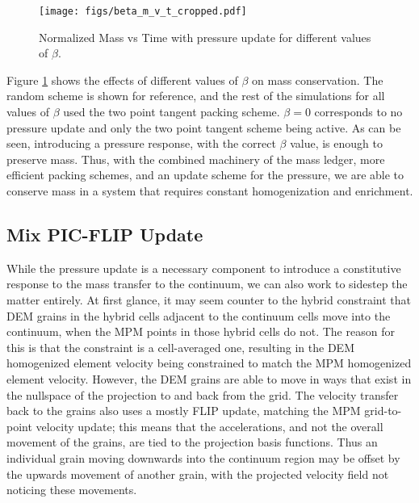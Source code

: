 \begin{figure}[htp] 
    \centering
    \texttt{[image: figs/beta\_m\_v\_t\_cropped.pdf]}
    \caption{Normalized Mass vs Time with pressure update for different values of $\beta$.}
    \label{beta_m_v_t}
\end{figure}

Figure \ref{beta_m_v_t} shows the effects of different values of $\beta$ on mass conservation. The random scheme is shown for reference, and the rest of the simulations for all values of $\beta$ used the two point tangent packing scheme. $\beta=0$ corresponds to no pressure update and only the two point tangent scheme being active. As can be seen, introducing a pressure response, with the correct $\beta$ value, is enough to preserve mass. Thus, with the combined machinery of the mass ledger, more efficient packing schemes, and an update scheme for the pressure, we are able to conserve mass in a system that requires constant homogenization and enrichment.

\subsection{Mix PIC-FLIP Update}
While the pressure update is a necessary component to introduce a constitutive response to the mass transfer to the continuum, we can also work to sidestep the matter entirely. At first glance, it may seem counter to the hybrid constraint that DEM grains in the hybrid cells adjacent to the continuum cells move into the continuum, when the MPM points in those hybrid cells do not. The reason for this is that the constraint is a cell-averaged one, resulting in the DEM homogenized element velocity being constrained to match the MPM homogenized element velocity. However, the DEM grains are able to move in ways that exist in the nullspace of the projection to and back from the grid. The velocity transfer back to the grains also uses a mostly FLIP update, matching the MPM grid-to-point velocity update; this means that the accelerations, and not the overall movement of the grains, are tied to the projection basis functions. Thus an individual grain moving downwards into the continuum region may be offset by the upwards movement of another grain, with the projected velocity field not noticing these movements. 

